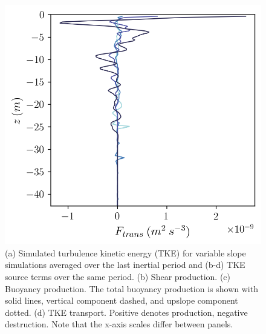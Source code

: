 \documentclass[draft]{agujournal2019}
\begin{document}
\begin{figure}
\begin{minipage}{0.5\textwidth}
    \end{minipage}%
    \begin{minipage}{0.5\textwidth}
        \includegraphics[trim={0 0 0 0},clip,width=\textwidth]{Figures/Ftrans_cmp_dslope_43h_tav13h_z_profile.png}
    \end{minipage}
    \caption{(a) Simulated turbulence kinetic energy (TKE) for variable slope simulations averaged over the last inertial period and (b-d) TKE source terms over the same period. (b) Shear production. (c) Buoyancy production. The total buoyancy production is shown with solid lines, vertical component dashed, and upslope component dotted. (d) TKE transport. Positive denotes production, negative destruction. Note that the x-axis scales differ between panels.}
    \label{fig:tke_budget}
\end{figure}
\end{document}
